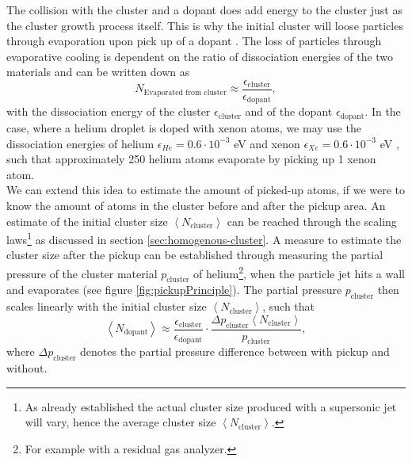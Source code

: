 The collision with the cluster and a dopant does add energy to the cluster just as the cluster growth process itself. This is why the initial cluster will loose particles through evaporation upon pick up of a dopant \citep{Gomez-2011-JCP}. The loss of particles through evaporative cooling is dependent on the ratio of dissociation energies of the two materials and can be written down as
\begin{equation}
N_{\text{Evaporated from cluster}} \approx \frac{\epsilon_{\text{cluster}}}{\epsilon_{\text{dopant}}},
\label{eq:evaporated-amount}
\end{equation}
with the dissociation energy of the cluster $\epsilon_{\text{cluster}}$ and of the dopant $\epsilon_{\text{dopant}}$. In the case, where a helium droplet is doped with xenon atoms, we may use the dissociation energies of helium $\epsilon_{He}=0.6\cdot 10^{-3}$ eV and xenon $\epsilon_{Xe}=0.6\cdot 10^{-3}$ eV \citep{Gomez-2011-JCP,Gomez-2014-Science}, such that approximately 250 helium atoms evaporate by picking up 1 xenon atom.\\
We can extend this idea to estimate the amount of picked-up atoms, if we were to know the amount of atoms in the cluster before and after the pickup area. An estimate of the initial cluster size $\left\langle N_{\text{cluster}}\right\rangle$ can be reached through the scaling laws\footnote{As already established the actual cluster size produced with a supersonic jet will vary, hence the average cluster size $\left\langle N_{\text{cluster}}\right\rangle$.} as discussed in section \ref{sec:homogenous-cluster}. A measure to estimate the cluster size after the pickup can be established through measuring the partial pressure of the cluster material $p_{\text{cluster}}$ of helium\footnote{For example with a residual gas analyzer.}, when the particle jet hits a wall and evaporates (see figure \ref{fig:pickupPrinciple}). The partial pressure $p_{\text{cluster}}$ then scales linearly with the initial cluster size $\left\langle N_{\text{cluster}}\right\rangle$, such that
\begin{equation}
\left\langle N_{\text{dopant}}\right\rangle \approx \frac{\epsilon_{\text{cluster}}}{\epsilon_{\text{dopant}}} \cdot \frac{\Delta p_{\text{cluster}} \left\langle N_{\text{cluster}}\right\rangle}{p_{\text{cluster}}},
\label{eq:average-dopant}
\end{equation}
where $\Delta p_{\text{cluster}}$ denotes the partial pressure difference between with pickup and without.
%

